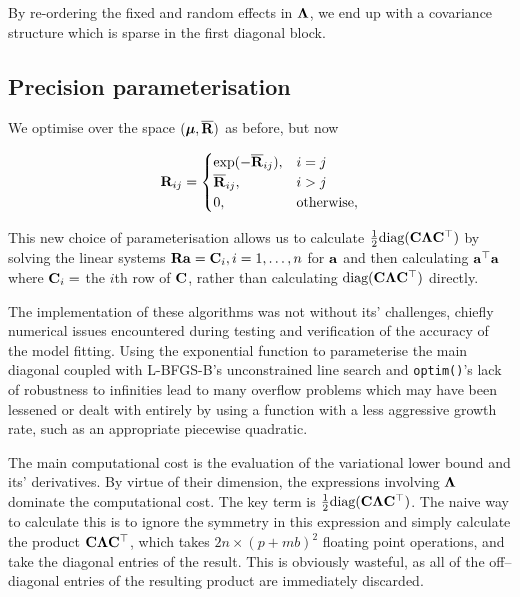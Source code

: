 \documentclass{amsart}[12pt]
\begin{document}
	By re-ordering the fixed and random effects in ${\boldsymbol \Lambda}$, we end up with a covariance structure which is 
	sparse in the first diagonal block.

	\subsection{Precision parameterisation}

	We optimise over the space $({\boldsymbol \mu}, \overline{{\bf R}})$ as before, but now 
		
	\begin{equation*}
		{\bf R}_{ij} =
		\begin{cases}
			\exp(-\overline{{\bf R}}_{ij}), & i = j             \\
			\overline{{\bf R}}_{ij},        & i > j             \\
			0,                          & \text{otherwise}, 
		\end{cases}
	\end{equation*}
	
	\noindent This new choice of parameterisation allows us to calculate $\tfrac{1}{2} \text{diag}({\bf C} {\boldsymbol \Lambda}
	{\bf C}^\top)$ by solving the linear systems ${\bf R} {\bf a} = {\bf C}_{i}, i=1, \ldots, n$ for   ${\bf a}$ and then calculating
	${\bf a}^\top{\bf a}$ where ${\bf C}_{i} = $ the $i$th row of ${\bf C}$, rather than calculating $\text{diag}({\bf C} {\boldsymbol \Lambda}
	{\bf C}^\top)$ directly.
	
	The implementation of these algorithms was not without its' challenges, chiefly numerical issues encountered during testing and verification of the accuracy of the model fitting. Using the exponential function to parameterise the main diagonal coupled with L-BFGS-B's unconstrained line search and \texttt{optim()}'s lack of robustness to infinities lead to many overflow problems which may have been lessened or dealt with entirely by using a function with a less aggressive growth rate, such as an appropriate piecewise quadratic.
	
	The main computational cost is the evaluation of the variational lower bound and its' derivatives. By virtue
	of their dimension, the expressions involving ${\boldsymbol \Lambda}$ dominate the computational cost. The key term is
	$\frac{1}{2} \text{diag}({\bf C} {\boldsymbol \Lambda} {\bf C}^\top)$. The naive way to calculate this is to ignore the symmetry in
	this expression and simply calculate the product ${\bf C} {\boldsymbol \Lambda} {\bf C}^\top$, which takes $2 n \times (p + m
	b)^2$ floating point operations, and take the diagonal entries of the result. This is obviously wasteful, as
	all of the off--diagonal entries of the resulting product are immediately discarded.
	
\end{document}
